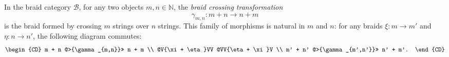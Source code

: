 In the braid category $\mathcal{B}$, for any two objects $m, n \in \mathbb{N}$, the \emph{braid crossing transformation}
$$
\gamma_{m,n} : m + n \longrightarrow n + m
$$
is the braid formed by crossing $m$ strings over $n$ strings. This family of morphisms is natural in $m$ and $n$: for any braids $\xi : m \to m'$ and $\eta : n \to n'$, the following diagram commutes:
\[
\begin{CD}
m + n @>{\gamma_{m,n}}>> n + m \\
@V{\xi + \eta}VV @VV{\eta + \xi}V \\
m' + n' @>{\gamma_{m',n'}}>> n' + m'.
\end{CD}
\]
